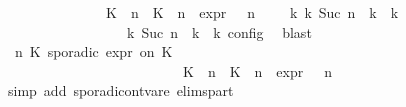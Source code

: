 \begin{isabellebody}
\ \ \ \ \ \ \ \ \ \ \ \ \ \ \ {\isacartoucheopen}{\isacharparenleft}{\isacharparenleft}{\isacharparenleft}{\isacharparenleft}K\ {\isasymUp}\ n{\isacharparenright}\ {\isacharhash}\ {\isacharparenleft}K\ {\isasymDown}\ n\ {\isacharat}{\isasymsharp}\ {\isasymtau}\isactrlsub e\isactrlsub x\isactrlsub p\isactrlsub r{\isacharparenright}\ {\isacharhash}\ {\isasymGamma}{\isacharparenright}{\isacharcomma}\ n\ {\isasymturnstile}\ {\isasymPsi}\ {\isasymtriangleright}\ {\isasymPhi}{\isacharparenright}\ {\isasymhookrightarrow}\isactrlbsup k\isactrlesup \ {\isacharparenleft}{\isasymGamma}\isactrlsub k{\isacharcomma}\ Suc\ n\ {\isasymturnstile}\ {\isasymPsi}\isactrlsub k\ {\isasymtriangleright}\ {\isasymPhi}\isactrlsub k{\isacharparenright}{\isacharparenright}{\isacartoucheclose}\isanewline
\ \ \ \ \ \ \ \ \ \ \ \ \ \ \ {\isacharasterisk}{\isacharcolon}{\isacartoucheopen}{\isasymrho}\ {\isasymin}\ {\isasymlbrakk}\ {\isasymGamma}\isactrlsub k{\isacharcomma}\ Suc\ n\ {\isasymturnstile}\ {\isasymPsi}\isactrlsub k\ {\isasymtriangleright}\ {\isasymPhi}\isactrlsub k\ {\isasymrbrakk}\isactrlsub c\isactrlsub o\isactrlsub n\isactrlsub f\isactrlsub i\isactrlsub g{\isacartoucheclose}\ \isamarkupfalse%
\ blast\isanewline
\ \ \ \ \ \ \ \ \ \ \isamarkupfalse%
\ \isamarkupfalse%
\ {\isacartoucheopen}{\isacharparenleft}{\isasymGamma}{\isacharcomma}\ n\ {\isasymturnstile}{\isacharparenleft}{\isacharparenleft}K\ sporadic{\isasymsharp}\ {\isasymtau}\isactrlsub e\isactrlsub x\isactrlsub p\isactrlsub r\ on\ K\ {\isacharhash}\ {\isasymPsi}{\isacharparenright}\ {\isasymtriangleright}\ {\isasymPhi}{\isacharparenright}\isanewline
\ \ \ \ \ \ \ \ \ \ \ \ \ \ \ \ \ \ \ \ \ \ \ \ \ \ {\isasymhookrightarrow}{\isacharparenleft}{\isacharparenleft}{\isacharparenleft}K\ {\isasymUp}\ n{\isacharparenright}\ {\isacharhash}\ {\isacharparenleft}K\ {\isasymDown}\ n\ {\isacharat}{\isasymsharp}\ {\isasymtau}\isactrlsub e\isactrlsub x\isactrlsub p\isactrlsub r{\isacharparenright}\ {\isacharhash}\ {\isasymGamma}{\isacharparenright}{\isacharcomma}\ n\ {\isasymturnstile}\ {\isasymPsi}\ {\isasymtriangleright}\ {\isasymPhi}{\isacharparenright}{\isacartoucheclose}\isanewline
\ \ \ \ \ \ \ \ \ \ \ \ \isamarkupfalse%
\ {\isacharparenleft}simp\ add{\isacharcolon}\ sporadic{\isacharunderscore}on{\isacharunderscore}tvar{\isacharunderscore}e{}\ elims{\isacharunderscore}part{\isacharparenright}\isanewline

\end{isabellebody}
